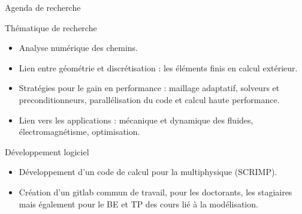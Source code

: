 \documentclass[aspectratio=169, french]{ISAE-Beamer}
\begin{document}
\begin{frame}{Agenda de recherche}
	
	\begin{block}{Thématique de recherche}
		\begin{itemize}
			\item Analyse numérique des chemins.
			\item Lien entre géométrie et discrétisation : les éléments finis en calcul extérieur.
			\item Stratégies pour le gain en performance : maillage adaptatif, solveurs et preconditionneurs, parallélisation du code et calcul haute performance. 
			\item Lien vers les applications : mécanique et dynamique des fluides, électromagnétisme, optimisation.
		\end{itemize}

		
	\end{block}
	
	
	\begin{block}{Développement logiciel}
		\begin{itemize}
			\item Développement d'un code de calcul pour la multiphysique (SCRIMP).
			\item Création d'un gitlab commun de travail, pour les doctorants, les stagiaires mais également pour le BE et TP des cours lié à la modélisation.
		\end{itemize}	
		
	\end{block}
	
\end{frame}
\end{document}
